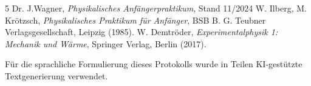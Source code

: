 \documentclass[12pt,a4paper,titlepage]{scrartcl}
\numberwithin{equation}{section}
\numberwithin{table}{section}
\numberwithin{figure}{section}
\begin{document}
\clearpage

\listoffigures


\listoftables

\begin{thebibliography}{5}
     Dr. J.Wagner, \emph{Physikalisches Anfängerpraktikum}, Stand 11/2024
     W. Ilberg, M. Krötzsch, \emph{Physikalisches Praktikum für Anfänger}, BSB B. G. Teubner Verlagsgesellschaft, Leipzig (1985).
     W. Demtröder, \emph{Experimentalphysik 1: Mechanik und Wärme}, Springer Verlag, Berlin (2017).
\end{thebibliography}



\begin{tcolorbox}[colback=gray!5,colframe=gray!60,boxrule=0.8pt,arc=0.01mm,title=KI-Hinweis]
    Für die sprachliche Formulierung dieses Protokolls wurde in Teilen KI-gestützte Textgenerierung verwendet. 
\end{tcolorbox}
\end{document}
